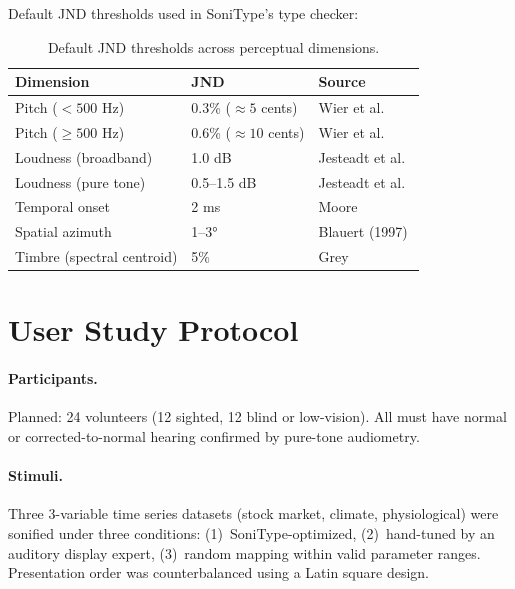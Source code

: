 \documentclass[sigchi, nonacm]{acmart}
\begin{document}
Default JND thresholds used in SoniType's type checker:

\begin{table}[h]
\centering
\caption{Default JND thresholds across perceptual dimensions.}
\label{tab:jnd_defaults}
\small
\begin{tabular}{lll}
\toprule
\textbf{Dimension} & \textbf{JND} & \textbf{Source} \\
\midrule
Pitch ($< 500$ Hz) & 0.3\% ($\approx 5$ cents) & Wier et al.~\cite{wier1977frequency} \\
Pitch ($\geq 500$ Hz) & 0.6\% ($\approx 10$ cents) & Wier et al.~\cite{wier1977frequency} \\
Loudness (broadband) & 1.0 dB & Jesteadt et al.~\cite{jesteadt1977intensity} \\
Loudness (pure tone) & 0.5--1.5 dB & Jesteadt et al.~\cite{jesteadt1977intensity} \\
Temporal onset & 2 ms & Moore~\cite{moore2012introduction} \\
Spatial azimuth & 1--3° & Blauert (1997) \\
Timbre (spectral centroid) & 5\% & Grey~\cite{grey1977multidimensional} \\
\bottomrule
\end{tabular}
\end{table}

\section{User Study Protocol}
\label{sec:appendix_userstudy}

\paragraph{Participants.} Planned: 24 volunteers (12 sighted, 12 blind or low-vision). All must have normal or corrected-to-normal hearing confirmed by pure-tone audiometry. %

\paragraph{Stimuli.} Three 3-variable time series datasets (stock market, climate, physiological) were sonified under three conditions: (1)~SoniType-optimized, (2)~hand-tuned by an auditory display expert, (3)~random mapping within valid parameter ranges. Presentation order was counterbalanced using a Latin square design.
\end{document}
